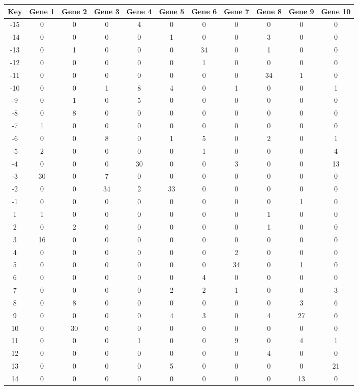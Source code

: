 \begin{tabular}{|c|c|c|c|c|c|c|c|c|c|c|}
\hline
Key & Gene 1 & Gene 2 & Gene 3 & Gene 4 & Gene 5 & Gene 6 & Gene 7 & Gene 8 & Gene 9 & Gene 10 \\
\hline
-15 & 0 & 0 & 0 & 4 & 0 & 0 & 0 & 0 & 0 & 0 \\
-14 & 0 & 0 & 0 & 0 & 1 & 0 & 0 & 3 & 0 & 0 \\
-13 & 0 & 1 & 0 & 0 & 0 & 34 & 0 & 1 & 0 & 0 \\
-12 & 0 & 0 & 0 & 0 & 0 & 1 & 0 & 0 & 0 & 0 \\
-11 & 0 & 0 & 0 & 0 & 0 & 0 & 0 & 34 & 1 & 0 \\
-10 & 0 & 0 & 1 & 8 & 4 & 0 & 1 & 0 & 0 & 1 \\
-9 & 0 & 1 & 0 & 5 & 0 & 0 & 0 & 0 & 0 & 0 \\
-8 & 0 & 8 & 0 & 0 & 0 & 0 & 0 & 0 & 0 & 0 \\
-7 & 1 & 0 & 0 & 0 & 0 & 0 & 0 & 0 & 0 & 0 \\
-6 & 0 & 0 & 8 & 0 & 1 & 5 & 0 & 2 & 0 & 1 \\
-5 & 2 & 0 & 0 & 0 & 0 & 1 & 0 & 0 & 0 & 4 \\
-4 & 0 & 0 & 0 & 30 & 0 & 0 & 3 & 0 & 0 & 13 \\
-3 & 30 & 0 & 7 & 0 & 0 & 0 & 0 & 0 & 0 & 0 \\
-2 & 0 & 0 & 34 & 2 & 33 & 0 & 0 & 0 & 0 & 0 \\
-1 & 0 & 0 & 0 & 0 & 0 & 0 & 0 & 0 & 1 & 0 \\
1 & 1 & 0 & 0 & 0 & 0 & 0 & 0 & 1 & 0 & 0 \\
2 & 0 & 2 & 0 & 0 & 0 & 0 & 0 & 1 & 0 & 0 \\
3 & 16 & 0 & 0 & 0 & 0 & 0 & 0 & 0 & 0 & 0 \\
4 & 0 & 0 & 0 & 0 & 0 & 0 & 2 & 0 & 0 & 0 \\
5 & 0 & 0 & 0 & 0 & 0 & 0 & 34 & 0 & 1 & 0 \\
6 & 0 & 0 & 0 & 0 & 0 & 4 & 0 & 0 & 0 & 0 \\
7 & 0 & 0 & 0 & 0 & 2 & 2 & 1 & 0 & 0 & 3 \\
8 & 0 & 8 & 0 & 0 & 0 & 0 & 0 & 0 & 3 & 6 \\
9 & 0 & 0 & 0 & 0 & 4 & 3 & 0 & 4 & 27 & 0 \\
10 & 0 & 30 & 0 & 0 & 0 & 0 & 0 & 0 & 0 & 0 \\
11 & 0 & 0 & 0 & 1 & 0 & 0 & 9 & 0 & 4 & 1 \\
12 & 0 & 0 & 0 & 0 & 0 & 0 & 0 & 4 & 0 & 0 \\
13 & 0 & 0 & 0 & 0 & 5 & 0 & 0 & 0 & 0 & 21 \\
14 & 0 & 0 & 0 & 0 & 0 & 0 & 0 & 0 & 13 & 0 \\
\hline
\end{tabular}